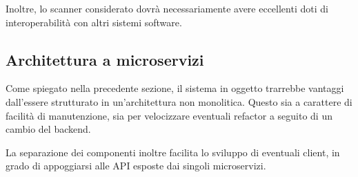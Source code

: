 Inoltre, lo scanner considerato dovrà necessariamente avere eccellenti doti di interoperabilità con altri sistemi software.

\subsection{Architettura a microservizi}
Come spiegato nella precedente sezione, il sistema in oggetto trarrebbe vantaggi dall'essere strutturato in un'architettura non monolitica. Questo sia a carattere di facilità di manutenzione, sia per velocizzare eventuali refactor a seguito di un cambio del backend.

La separazione dei componenti inoltre facilita lo sviluppo di eventuali client, in grado di appoggiarsi alle API esposte dai singoli microservizi.